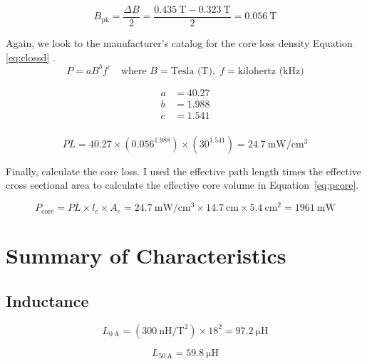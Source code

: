 \documentclass{article}
\begin{document}
\begin{equation}
    B_{\text{pk}} = \frac{\Delta B}{2} = \frac{\SI{0.435}{\tesla} - \SI{0.323}{\tesla}}{2} = \SI{0.056}{\tesla}
\end{equation}

Again, we look to the manufacturer's catalog for the core loss density Equation \eqref{eq:clossd} \cite[p. 104]{magincPowderCat2024}.
\begin{equation}
\label{eq:clossd}
P = a B^{b} f^{c} \quad \text{where } B = \text{Tesla (T)}, \; f = \text{kilohertz (kHz)}
\end{equation}

\[
\begin{aligned}
    a &= 40.27 \\
    b &= 1.988 \\
    c &= 1.541 \\
\end{aligned}
\]

\begin{equation}
    PL = \num{40.27} \times \left(\num{0.056}^{\num{1.988}}\right) \times \left(\num{30}^{\num{1.541}}\right) = \SI{24.7}{\milli\watt\per\centi\meter\cubed}
\end{equation}

Finally, calculate the core loss.  I used the effective path length times the effective cross sectional area to calculate the effective core volume in Equation~\eqref{eq:pcore}.

\begin{equation}
\label{eq:pcore}
    P_{\text{core}} = PL \times l_e \times A_e = \SI{24.7}{\milli\watt\per\centi\meter\cubed} \times \SI{14.7}{\centi\meter} \times \SI{5.4}{\centi\meter\squared} = \SI{1961}{\milli\watt}
\end{equation}

\section{Summary of Characteristics}
\subsection{Inductance}
\begin{equation}
L_{\SI{0}{\ampere}} = (\SI{300}{\nano\henry\per\text{T}^2}) \times \num{18}^2 = \SI{97.2}{\micro\henry}
\end{equation}

\begin{equation}
L_{\SI{50}{\ampere}} = \SI{59.8}{\micro\henry}
\end{equation}
\end{document}
